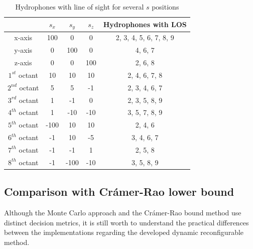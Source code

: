 \begin{table}[!htbp] %
	\begin{center}
		\begin{tabular}{ c c c c | c }
			\toprule
			\multicolumn{1}{c|}{} & \multicolumn{1}{c}{$s_x$} & $s_y$ & $s_z$ & Hydrophones with LOS\\
			\midrule
			\multicolumn{1}{c|}{x-axis} & \multirow{1}{*}{100} & 0 & 0 & 2, 3, 4, 5, 6, 7, 8, 9 \\
			\midrule
			\multicolumn{1}{c|}{y-axis} & \multirow{1}{*}{0} & 100 & 0 & 4, 6, 7 \\
			\midrule
			\multicolumn{1}{c|}{z-axis} & \multirow{1}{*}{0} & 0 & 100 & 2, 6, 8  \\
			\midrule
			\multicolumn{1}{c|}{$1^{st}$ octant} & \multirow{1}{*}{10} & 10 & 10 & 2, 4, 6, 7, 8 \\
			\midrule
			\multicolumn{1}{c|}{$2^{nd}$ octant} & \multirow{1}{*}{5} & 5 & -1 & 2, 3, 4, 6, 7 \\
			\midrule
			\multicolumn{1}{c|}{$3^{rd}$ octant} & \multirow{1}{*}{1} & -1 & 0 & 2, 3, 5, 8, 9  \\
			\midrule
			\multicolumn{1}{c|}{$4^{th}$ octant} & \multirow{1}{*}{1} & -10 & -10 & 3, 5, 7, 8, 9 \\
			\midrule
			\multicolumn{1}{c|}{$5^{th}$ octant} & \multirow{1}{*}{-100} & 10 & 10 & 2, 4, 6  \\
			\midrule
			\multicolumn{1}{c|}{$6^{th}$ octant} & \multirow{1}{*}{-1 } & 10 & -5 & 3, 4, 6, 7  \\
			\midrule
			\multicolumn{1}{c|}{$7^{th}$ octant} & \multirow{1}{*}{-1} & -1 & 1 & 2, 5, 8 \\
			\midrule
			\multicolumn{1}{c|}{$8^{th}$ octant} & \multirow{1}{*}{-1} & -100 & -10 & 3, 5, 8, 9 \\
			\bottomrule 
		\end{tabular}
		\caption{Hydrophones with line of sight for several $s$ positions}
		\label{tab:LOS-var-pos}
	\end{center}
\end{table}


\subsection{Comparison with Crámer-Rao lower bound}

Although the Monte Carlo approach and the Crámer-Rao bound method use distinct decision metrics,  it is still worth to understand the practical differences between the implementations regarding the developed dynamic reconfigurable method.

